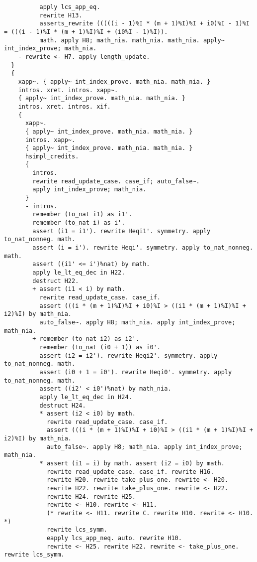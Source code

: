 \begin{verbatim}
          apply lcs_app_eq. 
          rewrite H13. 
          asserts_rewrite (((((i - 1)%I * (m + 1)%I)%I + i0)%I - 1)%I = (((i - 1)%I * (m + 1)%I)%I + (i0%I - 1)%I)). 
          math. apply H8; math_nia. math_nia. math_nia. apply~ int_index_prove; math_nia. 
    - rewrite <- H7. apply length_update. 
  }
  {
    xapp~. { apply~ int_index_prove. math_nia. math_nia. }
    intros. xret. intros. xapp~. 
    { apply~ int_index_prove. math_nia. math_nia. } 
    intros. xret. intros. xif. 
    {
      xapp~. 
      { apply~ int_index_prove. math_nia. math_nia. } 
      intros. xapp~. 
      { apply~ int_index_prove. math_nia. math_nia. } 
      hsimpl_credits.
      {
        intros. 
        rewrite read_update_case. case_if; auto_false~. 
        apply int_index_prove; math_nia. 
      }
      - intros. 
        remember (to_nat i1) as i1'. 
        remember (to_nat i) as i'. 
        assert (i1 = i1'). rewrite Heqi1'. symmetry. apply to_nat_nonneg. math. 
        assert (i = i'). rewrite Heqi'. symmetry. apply to_nat_nonneg. math. 
        assert ((i1' <= i')%nat) by math. 
        apply le_lt_eq_dec in H22. 
        destruct H22. 
        + assert (i1 < i) by math. 
          rewrite read_update_case. case_if. 
          assert (((i * (m + 1)%I)%I + i0)%I > ((i1 * (m + 1)%I)%I + i2)%I) by math_nia. 
          auto_false~. apply H8; math_nia. apply int_index_prove; math_nia. 
        + remember (to_nat i2) as i2'. 
          remember (to_nat (i0 + 1)) as i0'. 
          assert (i2 = i2'). rewrite Heqi2'. symmetry. apply to_nat_nonneg. math. 
          assert (i0 + 1 = i0'). rewrite Heqi0'. symmetry. apply to_nat_nonneg. math. 
          assert ((i2' < i0')%nat) by math_nia. 
          apply le_lt_eq_dec in H24. 
          destruct H24. 
          * assert (i2 < i0) by math. 
            rewrite read_update_case. case_if. 
            assert (((i * (m + 1)%I)%I + i0)%I > ((i1 * (m + 1)%I)%I + i2)%I) by math_nia. 
            auto_false~. apply H8; math_nia. apply int_index_prove; math_nia. 
          * assert (i1 = i) by math. assert (i2 = i0) by math. 
            rewrite read_update_case. case_if. rewrite H16. 
            rewrite H20. rewrite take_plus_one. rewrite <- H20. 
            rewrite H22. rewrite take_plus_one. rewrite <- H22. 
            rewrite H24. rewrite H25. 
            rewrite <- H10. rewrite <- H11. 
            (* rewrite <- H11. rewrite C. rewrite H10. rewrite <- H10.  *)
            rewrite lcs_symm. 
            eapply lcs_app_neq. auto. rewrite H10. 
            rewrite <- H25. rewrite H22. rewrite <- take_plus_one. rewrite lcs_symm. 

\end{verbatim}

